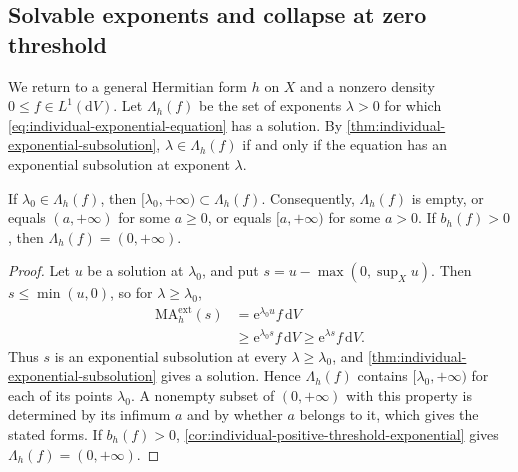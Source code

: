 \subsection{Solvable exponents and collapse at zero threshold}

We return to a general Hermitian form $h$ on $X$ and a nonzero density $0\leq f\in L^1(\mathrm dV)$. Let $\Lambda_h(f)$ be the set of exponents $\lambda>0$ for which \eqref{eq:individual-exponential-equation} has a solution. By \cref{thm:individual-exponential-subsolution}, $\lambda\in\Lambda_h(f)$ if and only if the equation has an exponential subsolution at exponent $\lambda$.

\begin{proposition}\label{prop:solvable-exponents-upper-interval}
If $\lambda_0\in\Lambda_h(f)$, then $[\lambda_0,+\infty)\subset\Lambda_h(f)$. Consequently, $\Lambda_h(f)$ is empty, or equals $(a,+\infty)$ for some $a\geq0$, or equals $[a,+\infty)$ for some $a>0$. If $b_h(f)>0$, then $\Lambda_h(f)=(0,+\infty)$.
\end{proposition}
\begin{proof}
Let $u$ be a solution at $\lambda_0$, and put $s=u-\max(0,\sup_Xu)$. Then $s\leq\min(u,0)$, so for $\lambda\geq\lambda_0$,
\begin{align*}
 \mathrm{MA}^{\mathrm{ext}}_h(s)
 &=\mathrm e^{\lambda_0u}f\,\mathrm dV\\
 &\geq\mathrm e^{\lambda_0s}f\,\mathrm dV
 \geq\mathrm e^{\lambda s}f\,\mathrm dV.
\end{align*}
Thus $s$ is an exponential subsolution at every $\lambda\geq\lambda_0$, and \cref{thm:individual-exponential-subsolution} gives a solution. Hence $\Lambda_h(f)$ contains $[\lambda_0,+\infty)$ for each of its points $\lambda_0$. A nonempty subset of $(0,+\infty)$ with this property is determined by its infimum $a$ and by whether $a$ belongs to it, which gives the stated forms. If $b_h(f)>0$, \cref{cor:individual-positive-threshold-exponential} gives $\Lambda_h(f)=(0,+\infty)$.
\end{proof}

